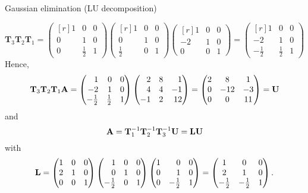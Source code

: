 \begin{vbframe}{Gaussian elimination (LU decomposition)}
\begin{enumerate}
\footnotesize
$$
\mathbf{T}_3\mathbf{T}_2\mathbf{T}_1 = \begin{pmatrix*}[r]
1 & 0 & 0 \\
0 & 1 & 0 \\
0 & \frac{1}{2} & 1\end{pmatrix*}
\begin{pmatrix*}[r]
1 & 0 & 0 \\
0 & 1 & 0 \\
\frac{1}{2} & 0 & 1 \end{pmatrix*}
\begin{pmatrix*}[r]
1 & 0 & 0 \\
-2 & 1 & 0 \\
0 & 0 & 1 \end{pmatrix*}
=
\begin{pmatrix*}[r]
1 & 0 & 0 \\
-2 & 1 & 0 \\
-\frac{1}{2} & \frac{1}{2} & 1 \end{pmatrix*}
$$ \normalsize
Hence,
\footnotesize
$$
\mathbf{T}_3\mathbf{T}_2\mathbf{T}_1\Amat =
\begin{pmatrix*}[r]
1 & 0 & 0 \\
-2 & 1 & 0 \\
-\frac{1}{2} & \frac{1}{2} & 1 \end{pmatrix*}
\begin{pmatrix*}[r]
2 & 8 & 1 \\
4 & 4 & -1 \\
-1 & 2 & 12\end{pmatrix*} =
\mat{
2 & 8 & 1 \\
0 & -12 & -3 \\
0 & 0 & 11 }
= \mathbf{U}
$$ \normalsize
and
\footnotesize
$$
\mathbf{A} = \mathbf{T}_1^{-1}\mathbf{T}_2^{-1}\mathbf{T}_3^{-1}\mathbf{U} = \mathbf{LU}
$$
\normalsize
with
\footnotesize
$$
\mathbf{L} = \begin{pmatrix*}[r]
1 & 0 & 0 \\
2 & 1 & 0 \\
0 & 0 & 1\end{pmatrix*}
\begin{pmatrix*}[r]
1 & 0 & 0 \\
0 & 1 & 0 \\
-\frac{1}{2} & 0 & 1 \end{pmatrix*}
\begin{pmatrix*}[r]
1 & 0 & 0 \\
0 & 1 & 0 \\
0 & -\frac{1}{2} & 1 \end{pmatrix*} =
\mat{
1 & 0 & 0 \\
2 & 1 & 0 \\
-\frac{1}{2} & -\frac{1}{2} & 1 }.
$$
\normalsize
\framebreak


\end{enumerate}
\end{vbframe}
